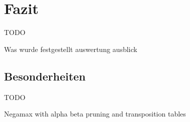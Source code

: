 \chapter{Fazit}%

\label{cha:Fazit}
\colorbox{red!30}{TODO}

Was wurde festgestellt
auswertung ausblick

\section{Besonderheiten}

\colorbox{red!30}{TODO}

\colorbox{red!30}{Negamax with alpha beta pruning and transposition tables}